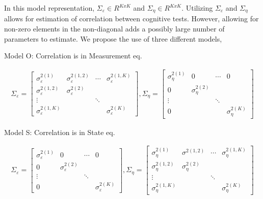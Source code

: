 \documentclass[
]{article}
\begin{document}
In this model representation, \(\Sigma_\varepsilon \in R^{KxK}\) and \(\Sigma_\eta \in R^{KxK}\). Utilizing \(\Sigma_\varepsilon\) and \(\Sigma_\eta\) allows for estimation of correlation between cognitive tests. However, allowing for non-zero elements in the non-diagonal adds a possibly large number of parameters to estimate. We propose the use of three different models,

Model O: Correlation is in Measurement eq.

\begin{equation*}
\begin{aligned}
\Sigma_\varepsilon =
\begin{bmatrix}
\sigma^{2(1)}_\varepsilon & \sigma^{2(1,2)}_\varepsilon & \cdots & \sigma^{2(1, K)}_\varepsilon\\
\sigma^{2(1,2)}_\varepsilon & \sigma^{2(2)}_\varepsilon\\
\vdots & & \ddots\\
\sigma^{2(1, K)}_\varepsilon & & &\sigma^{2(K)}_\varepsilon
\end{bmatrix},
\Sigma_\eta = 
\begin{bmatrix}
\sigma^{2(1)}_\eta & 0 & \cdots & 0\\
0 & \sigma^{2(2)}_\eta\\
\vdots & & \ddots\\
0 & & &\sigma^{2(K)}_\eta
\end{bmatrix}
\end{aligned}
\end{equation*}

Model S: Correlation is in State eq.

\begin{equation*}
\begin{aligned}
\Sigma_\varepsilon = 
\begin{bmatrix}
\sigma^{2(1)}_\varepsilon & 0 & \cdots & 0\\
0 & \sigma^{2(2)}_\varepsilon\\
\vdots & & \ddots\\
0 & & &\sigma^{2(K)}_\varepsilon
\end{bmatrix},
\Sigma_\eta =
\begin{bmatrix}
\sigma^{2(1)}_\eta & \sigma^{2(1,2)} & \cdots & \sigma^{2(1, K)}_\eta\\
\sigma^{2(1,2)}_\eta & \sigma^{2(2)}_\eta\\
\vdots & & \ddots\\
\sigma^{2(1, K)}_\eta & & &\sigma^{2(K)}_\eta
\end{bmatrix}
\end{aligned}
\end{equation*}
\end{document}
